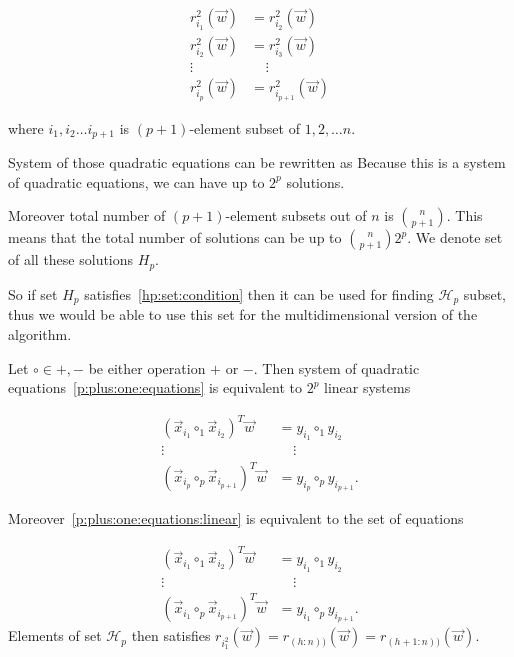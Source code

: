 \begin{align} 
    r^{2}_{i_1}(\vec{w}) &= r^{2}_{i_2}(\vec{w}) \label{p:plus:one:equations}   \\
    r^{2}_{i_2}(\vec{w}) &= r^{2}_{i_3}(\vec{w}) \nonumber  \\
    \vdots \ \ \  & \ \ \ \  \ \vdots  \nonumber \\ 
    r^{2}_{i_p}(\vec{w}) &=  r^{2}_{i_{p+1}}(\vec{w}) \nonumber 
\end{align}

where $i_1, i_2 \ldots i_{p+1}$  is $(p+1)$-element subset of ${1, 2, \ldots n}$.


System of those quadratic equations can be rewritten as 
Because this is a system of quadratic equations, we can have up to $2^p$ solutions.

Moreover total number of $(p+1)$-element subsets out of $n$ is $\binom{n}{p+1}$.
This means that the total number of solutions can be up to $\binom{n}{p+1} 2^p$. 
We denote set of all these solutions $H_p$.

So if set $H_p$ satisfies~\eqref{hp:set:condition} then it can be used for finding $\mathcal{H}_p$ subset, thus we would be able to use this set for the multidimensional version of the algorithm.

Let $\circ \in {+, -}$ be either operation $+$ or $-$. Then system of quadratic equations~\eqref{p:plus:one:equations} is equivalent to $2^p$ linear systems

\begin{align} 
    (\vec{x}_{i_1} \circ_1 \vec {x}_{i_2} )^T \vec{w} &= y_{i_1} \circ_1 y_{i_2} \label{p:plus:one:equations:linear}   \\
    \vdots \ \ \  & \ \ \ \  \ \vdots  \nonumber \\ 
    (\vec{x}_{i_p} \circ_p \vec {x}_{i_{p+1}} )^T \vec{w} &= y_{i_p} \circ_p y_{i_{p+1}}. \nonumber 
\end{align}

Moreover~\eqref{p:plus:one:equations:linear} is equivalent to the set of equations


\begin{align} 
    (\vec{x}_{i_1} \circ_1 \vec {x}_{i_2} )^T \vec{w} &= y_{i_1} \circ_1 y_{i_2} \label{p:plus:one:equations:linear:simple}   \\
    \vdots \ \ \  & \ \ \ \  \ \vdots  \nonumber \\ 
    (\vec{x}_{i_1} \circ_p \vec {x}_{i_{p+1}} )^T \vec{w} &= y_{i_1} \circ_p y_{i_{p+1}}. \nonumber 
\end{align}
Elements of set $\mathcal{H}_p$ then satisfies $r_{i_1^2}(\vec{w}) = r_{(h:n))}(\vec{w}) = r_{(h+1:n))}(\vec{w})$.


